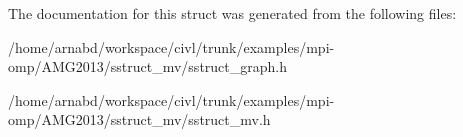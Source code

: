 The documentation for this struct was generated from the following files\+:\begin{DoxyCompactItemize}
\item 
/home/arnabd/workspace/civl/trunk/examples/mpi-\/omp/\+A\+M\+G2013/sstruct\+\_\+mv/sstruct\+\_\+graph.\+h\item 
/home/arnabd/workspace/civl/trunk/examples/mpi-\/omp/\+A\+M\+G2013/sstruct\+\_\+mv/sstruct\+\_\+mv.\+h\end{DoxyCompactItemize}
